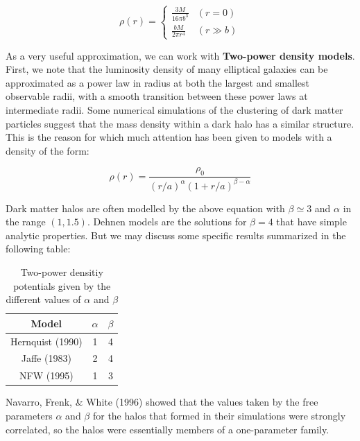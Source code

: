 \begin{equation}
\rho(r) = \left\lbrace
\begin{array}{ll}
\frac{3M}{16\pi b^{3}} & (r=0)\\
\frac{bM}{2\pi r^{4}} & (r\gg b)
\end{array}
\right.
\end{equation} 

As a very useful approximation, we can work with \textbf{Two-power density models}. First, we note that the luminosity density of many elliptical galaxies can be approximated as a power law in radius at both the largest and smallest observable radii, with a smooth transition between these power laws at intermediate radii. Some numerical simulations of the clustering of dark matter particles suggest that the mass density within a dark halo has a similar structure. This is the reason for which much attention has been given to models with a density of the form:

\begin{equation}
\rho(r)=\frac{\rho_{0}}{\left(r/a\right)^{\alpha}\left(1+r/a\right)^{\beta-\alpha}}
\end{equation}

Dark matter halos are often modelled by the above equation with $\beta\simeq3$ and $\alpha$ in the range $(1,1.5)$. Dehnen models are the solutions for $\beta =4$ that have simple analytic properties. But we may discuss some specific results summarized in the following table:

\begin{table}[H]
\begin{center}
  \begin{tabular}{| c|  c|  c| }
    \hline
    \textbf{Model} & $\alpha $ & $\beta $ \\ \hline
    Hernquist (1990) & 1 & 4 \\ \hline
    Jaffe (1983) & 2 & 4 \\ \hline
    NFW (1995) & 1 & 3 \\
    \hline
  \end{tabular}
\end{center} 
\caption[Two power density potentials]{Two-power densitiy potentials given by the different values of $\alpha$ and $\beta$}
\end{table}

Navarro, Frenk, \& White (1996) showed that the values taken by the free parameters $\alpha$ and $\beta$ for the halos that formed in their simulations were strongly correlated, so the halos were essentially members of a one-parameter family. 

